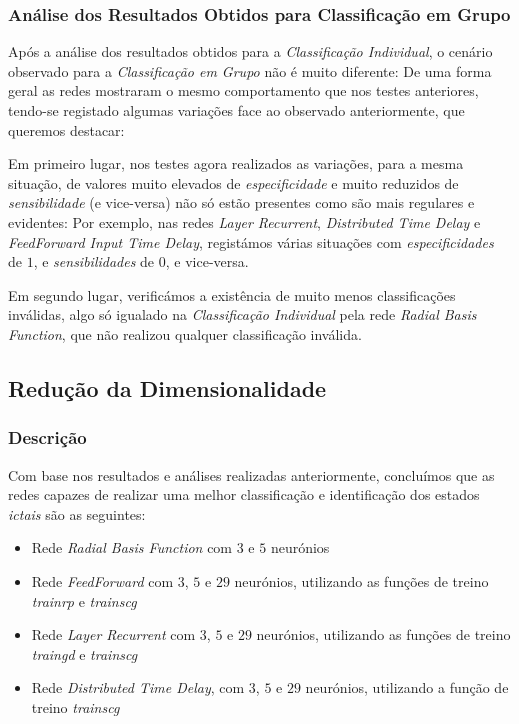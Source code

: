 \documentclass{article}
\begin{document}
\subsubsection{Análise dos Resultados Obtidos para Classificação em Grupo}

Após a análise dos resultados obtidos para a \emph{Classificação Individual}, o cenário observado para a \emph{Classificação em Grupo} não é muito diferente: De uma forma geral as redes mostraram o mesmo comportamento que nos testes anteriores, tendo-se registado algumas variações face ao observado anteriormente, que queremos destacar:

Em primeiro lugar, nos testes agora realizados as variações, para a mesma situação, de valores muito elevados de \emph{especificidade} e muito reduzidos de \emph{sensibilidade} (e vice-versa) não só estão presentes como são mais regulares e evidentes: Por exemplo, nas redes \emph{Layer Recurrent}, \emph{Distributed Time Delay} e \emph{FeedForward Input Time Delay}, registámos várias situações com \emph{especificidades} de $1$, e \emph{sensibilidades} de $0$, e vice-versa.

Em segundo lugar, verificámos a existência de muito menos classificações inválidas, algo só igualado na \emph{Classificação Individual} pela rede \emph{Radial Basis Function}, que não realizou qualquer classificação inválida.

\subsection{Redução da Dimensionalidade}

\subsubsection{Descrição}

Com base nos resultados e análises realizadas anteriormente, concluímos que as redes capazes de realizar uma melhor classificação e identificação dos estados \emph{ictais} são as seguintes:

\begin{itemize}
\item Rede \emph{Radial Basis Function} com $3$ e $5$ neurónios

\item Rede \emph{FeedForward} com $3$, $5$ e $29$ neurónios, utilizando as funções de treino \emph{trainrp} e \emph{trainscg}

\item Rede \emph{Layer Recurrent} com $3$, $5$ e $29$ neurónios, utilizando as funções de treino \emph{traingd} e \emph{trainscg}

\item Rede \emph{Distributed Time Delay}, com $3$, $5$ e $29$ neurónios, utilizando a função de treino \emph{trainscg}
\end{itemize}
\end{document}
